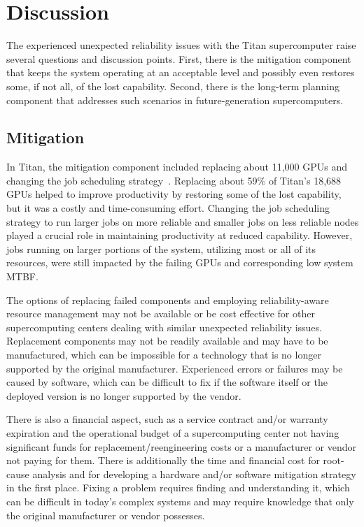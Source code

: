 \section{Discussion}
\label{section:discussion}

The experienced unexpected reliability issues with the Titan supercomputer raise
several questions and discussion points. First, there is the mitigation component
that keeps the system operating at an acceptable level and possibly even restores
some, if not all, of the lost capability. Second, there is the long-term planning
component that addresses such scenarios in future-generation supercomputers.

\subsection{Mitigation}
\label{section:mitigation}

In Titan, the mitigation component included replacing about 11,000 GPUs and
changing the job scheduling strategy~\cite{8665764}. Replacing about 59\% of
Titan's 18,688 GPUs helped to improve productivity by restoring some of the lost
capability, but it was a costly and time-consuming effort. Changing the job
scheduling strategy to run larger jobs on more reliable and smaller jobs on less
reliable nodes played a crucial role in maintaining productivity at reduced
capability. However, jobs running on larger portions of the system, utilizing
most or all of its resources, were still impacted by the failing GPUs and
corresponding low system MTBF.

The options of replacing failed components and employing reliability-aware
resource management may not be available or be cost effective for other
supercomputing centers dealing with similar unexpected reliability issues.
%
Replacement components may not be readily available and may have to be
manufactured, which can be impossible for a technology that is no longer supported
by the original manufacturer. Experienced errors or failures may be caused by
software, which can be difficult to fix if the software itself or the deployed
version is no longer supported by the vendor.

There is also a financial aspect, such as a service contract and/or warranty
expiration and the operational budget of a supercomputing center not having
significant funds for replacement/reengineering costs or a manufacturer or
vendor not paying for them.
%
There is additionally the time and financial cost for root-cause analysis and
for developing a hardware and/or software mitigation strategy in the first place.
Fixing a problem requires finding and understanding it, which can be difficult 
in today's complex systems and may require knowledge that only the original 
manufacturer or vendor possesses.

